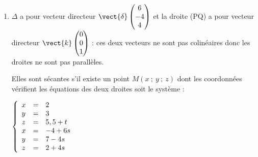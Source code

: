 \begin{enumerate}
\begin{enumerate}
On a $M(x~;~y~;~z) \in (\text{PQ}) \iff \vect{\text{Q}M} = t\vect{k}, \quad (t \in \R) \iff \left\{\begin{array}{l c l}
x - 2 &=& 0t\\
y - 3&=&0t\\
z - 5,5&=&1t
\end{array}\right.\iff \left\{\begin{array}{l c l}
x &=& 2\\
y &=&3\\
z &=&5,5 + t
\end{array}\right., \quad (t \in \R)$.
		\item 
Les coordonnées du point P vérifient les équations paramétriques de la droite (PQ) et du plan (EFS), donc du système :

$\left\{\begin{array}{l c l}
x &=&2\\
y &=&3\\
z &=&5,5 + t\\
y + z &=& 8
\end{array}\right. \Rightarrow 3 + 5,5 + t  = 8 \iff t = - 0,5$.

Conclusion : P(2~;~3~;~5).
		\item 
On a PQ$^2 = (2 - 2)^2 + (3 - 3)^2 + (5,5 - 5)^2 = 0,25$ , donc PQ $ = 0,5$.
	\end{enumerate}	








\item 
$\Delta$ a pour vecteur directeur $\vect{\delta}\begin{pmatrix}6\\-4\\4\end{pmatrix}$ et la droite (PQ) a pour vecteur directeur $\vect{k}\begin{pmatrix}0\\0\\1\end{pmatrix}$ : ces deux vecteurs ne sont pas colinéaires donc les droites ne sont pas parallèles.

Elles sont sécantes s'il existe un point $M(x~;~y~;~z)$ dont les coordonnées vérifient les équations des deux droites soit le système :

$\left\{\begin{array}{l c l}
x &=&2\\
y &=&3\\
z &=&5,5 + t\\
x & =& -4 + 6s\\
y &=& 7 - 4s\\
z &=& 2 + 4s
\end{array}\right.$


\end{enumerate}

